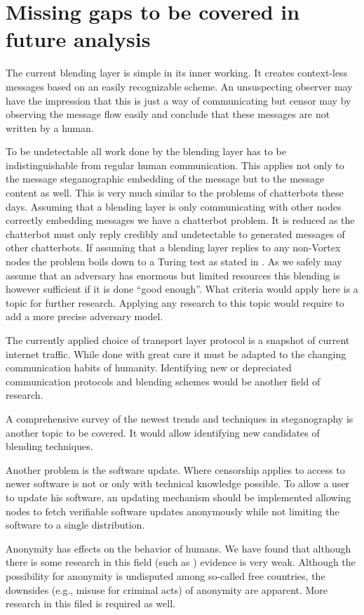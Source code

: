 \chapter{Missing gaps to be covered in future analysis}
The current blending layer is simple in its inner working. It creates context-less messages based on an easily recognizable scheme. An unsuspecting observer may have the impression that this is just a way of communicating but censor may by observing the message flow easily and conclude that these messages are not written by a human.

To be undetectable all work done by the blending layer has to be indistinguishable from regular human communication. This applies not only to the message steganographic embedding of the message but to the message content as well. This is very much similar to the problems of chatterbots these days. Assuming that a blending layer is only communicating with other nodes correctly embedding messages we have a chatterbot problem. It is reduced as the chatterbot must only reply credibly and undetectable to generated messages of other chatterbots. If assuming that a blending layer replies to any non-Vortex nodes the problem boils down to a Turing test as stated in \cite{turing1950computing}. As we safely may assume that an adversary has enormous but limited resources this blending is however sufficient if it is done ``good enough''. What criteria would apply here is a topic for further research. Applying any research to this topic would require to add a more precise adversary model.

The currently applied choice of transport layer protocol is a snapshot of current internet traffic. While done with great care it must be adapted to the changing communication habits of humanity. Identifying new or depreciated communication protocols and blending schemes would be another field of research.

A comprehensive survey of the newest trends and techniques in steganography is another topic to be covered. It would allow identifying new candidates of blending techniques.

Another problem is the software update. Where censorship applies to access to newer software is not or only with technical knowledge possible. To allow a user to update his software, an updating mechanism should be implemented allowing nodes to fetch verifiable software updates anonymously while not limiting the software to a single distribution.

Anonymity has effects on the behavior of humans. We have found that although there is some research in this field (such as \cite{postmes2001social}) evidence is very weak. Although the possibility for anonymity is undisputed among so-called free countries, the downsides (e.g., misuse for criminal acts) of anonymity are apparent. More research in this filed is required as well.


